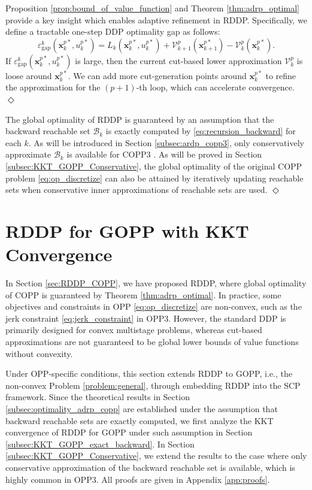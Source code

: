 \documentclass[journal]{IEEEtran}
\theoremstyle{definition}
\theoremstyle{definition}
\newtheorem*{remark}{Remark}
\let\oldremark\remark
\let\endoldremark\endremark
\renewenvironment{remark}
  {\oldremark}
  {\hfill$\Diamond$\endoldremark}
\renewcommand\vector[1]{\boldsymbol{#1}}
\newcommand\vx{{\vector{x}}}
\begin{document}
\begin{remark}
    Proposition \ref{prop:bound_of_value_function} and Theorem \ref{thm:adrp_optimal} provide a key insight which enables adaptive refinement in RDDP. Specifically, we define a tractable one-step DDP optimality gap as follows:
    \begin{equation}\label{eq:dual_gap_k}
        \varepsilon_\text{gap}^k(\vx_k^{p*}, u_k^{p*}) = L_k(\vx_k^{p*}, u_k^{p*}) + \mathcal{V}_{k+1}^p(\vx_{k+1}^{p*}) - \mathcal{V}_k^p(\vx_k^{p*}).
    \end{equation}
    If $\varepsilon_\text{gap}^k(\vx_k^{p*}, u_k^{p*})$ is large, then the current cut-based lower approximation $\mathcal{V}_k^p$ is loose around $\vx_k^{p*}$. We can add more cut-generation points around $\vx_k^{p*}$ to refine the approximation for the $(p+1)$-th loop, which can accelerate convergence.
\end{remark}

\begin{remark}
    The global optimality of RDDP is guaranteed by an assumption that the backward reachable set $\mathcal{B}_k$ is exactly computed by \eqref{eq:recursion_backward} for each $k$. As will be introduced in Section \ref{subsec:ardp_copp3}, only conservatively approximate $\mathcal{B}_k$ is available for COPP3 \cite{dio2025time}. As will be proved in Section \ref{subsec:KKT_GOPP_Conservative}, the global optimality of the original COPP problem \eqref{eq:op_discretize} can also be attained by iteratively updating reachable sets when conservative inner approximations of reachable sets are used.
\end{remark}

\section{RDDP for GOPP with KKT Convergence}\label{sec:RDDP_GOPP}

In Section \ref{sec:RDDP_COPP}, we have proposed RDDP, where global optimality of COPP is guaranteed by Theorem \ref{thm:adrp_optimal}. In practice, some objectives and constraints in OPP \eqref{eq:op_discretize} are non-convex, such as the jerk constraint \eqref{eq:jerk_constraint} in OPP3. However, the standard DDP is primarily designed for convex multistage problems, whereas cut-based approximations are not guaranteed to be global lower bounds of value functions without convexity.

Under OPP-specific conditions, this section extends RDDP to GOPP, i.e., the non-convex Problem \ref{problem:general}, through embedding RDDP into the SCP framework. Since the theoretical results in Section \ref{subsec:optimality_adrp_copp} are established under the assumption that backward reachable sets are exactly computed, we first analyze the KKT convergence of RDDP for GOPP under such assumption in Section \ref{subsec:KKT_GOPP_exact_backward}. In Section \ref{subsec:KKT_GOPP_Conservative}, we extend the results to the case where only conservative approximation of the backward reachable set is available, which is highly common in OPP3. All proofs are given in Appendix \ref{app:proofs}.
\end{document}
